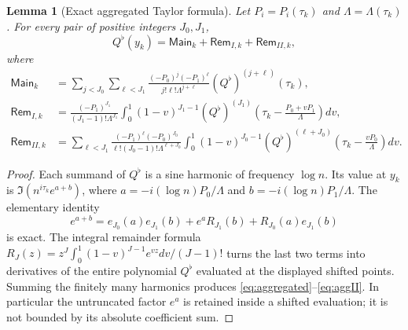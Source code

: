 \documentclass[11pt,reqno]{amsart}
\numberwithin{equation}{section}
\newtheorem{lemma}[theorem]{Lemma}
\begin{document}
\begin{lemma}[Exact aggregated Taylor formula]\label{lem:aggregated}
Let $P_i=P_i(\tau_k)$ and $\Lambda=\Lambda(\tau_k)$.
For every pair of positive integers $J_0,J_1$,
\begin{equation}\label{eq:aggregated}
Q^\flat(y_k)=\mathsf{Main}_k+
\mathsf{Rem}_{I,k}+\mathsf{Rem}_{II,k},
\end{equation}
where
\begin{align}
\mathsf{Main}_k
 &=\sum_{j<J_0}\sum_{\ell<J_1}
 \frac{(-P_0)^j(-P_1)^\ell}{j!\ell!\Lambda^{j+\ell}}
 (Q^\flat)^{(j+\ell)}(\tau_k),\label{eq:aggmain}\\
\mathsf{Rem}_{I,k}
 &=\frac{(-P_1)^{J_1}}{(J_1-1)!\Lambda^{J_1}}
 \int_0^1(1-v)^{J_1-1}(Q^\flat)^{(J_1)}
 \left(\tau_k-\frac{P_0+vP_1}{\Lambda}\right)dv,\label{eq:aggI}\\
\mathsf{Rem}_{II,k}
 &=\sum_{\ell<J_1}
 \frac{(-P_1)^\ell(-P_0)^{J_0}}
 {\ell!(J_0-1)!\Lambda^{\ell+J_0}}
 \int_0^1(1-v)^{J_0-1}(Q^\flat)^{(\ell+J_0)}
 \left(\tau_k-\frac{vP_0}{\Lambda}\right)dv.\label{eq:aggII}
\end{align}
\end{lemma}
\begin{proof}
Each summand of $Q^\flat$ is a sine harmonic of frequency
$\log n$.  Its value at $y_k$ is
$\Im(n^{i\tau_k}e^{a+b})$, where
$a=-i(\log n)P_0/\Lambda$ and
$b=-i(\log n)P_1/\Lambda$.
The elementary identity
\[
e^{a+b}=e_{J_0}(a)e_{J_1}(b)
 +e^aR_{J_1}(b)+R_{J_0}(a)e_{J_1}(b)
\]
is exact.  The integral remainder formula
$R_J(z)=z^J\int_0^1(1-v)^{J-1}e^{vz}dv/(J-1)!$
turns the last two terms into derivatives of the entire
polynomial $Q^\flat$ evaluated at the displayed shifted points.
Summing the finitely many harmonics produces
\eqref{eq:aggregated}--\eqref{eq:aggII}.  In particular the
untruncated factor $e^a$ is retained inside a shifted evaluation;
it is not bounded by its absolute coefficient sum.
\end{proof}
\end{document}
